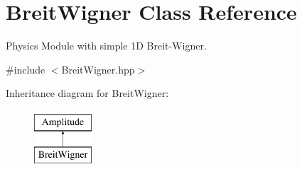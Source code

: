 \hypertarget{class_breit_wigner}{\section{Breit\-Wigner Class Reference}
\label{class_breit_wigner}
}


Physics Module with simple 1\-D Breit-\/\-Wigner.  




{\ttfamily \#include $<$Breit\-Wigner.\-hpp$>$}

Inheritance diagram for Breit\-Wigner\-:\begin{figure}[H]
\begin{center}
\leavevmode
\includegraphics[height=2.000000cm]{class_breit_wigner}
\end{center}
\end{figure}
